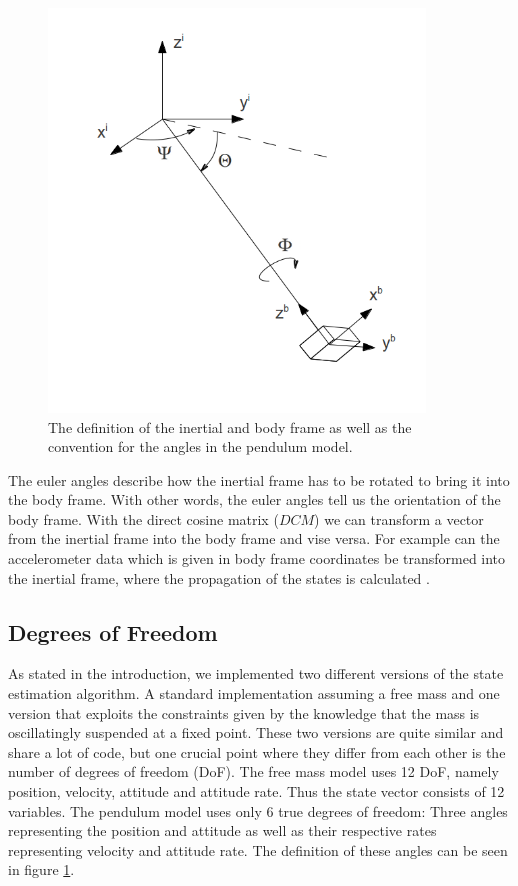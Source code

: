  \begin{figure}[h]
\begin{center}
\includegraphics[width=10cm]{pictures/sketch_coordinate_systems.png}
\caption{The definition of the inertial and body frame as well as the convention for the angles in the pendulum model.}
\label{dof}
\end{center}
\end{figure}

The euler angles describe how the inertial frame has to be rotated to bring it into the body frame. With other words, the euler angles tell us the orientation of the body frame. With the direct cosine matrix ($DCM$) we can transform a vector from the inertial frame into the body frame and vise versa. For example can the accelerometer data which is given in body frame coordinates be transformed into the inertial frame, where the propagation of the states is calculated \cite{andrews2007}.

\subsection*{Degrees of Freedom}
As stated in the introduction, we implemented two different versions of the state estimation algorithm. A standard implementation assuming a free mass and one version that exploits the constraints given by the knowledge that the mass is oscillatingly suspended at a fixed point. These two versions are quite similar and share a lot of code, but one crucial point where they differ from each other is the number of degrees of freedom (DoF). The free mass model uses 12 DoF, namely position, velocity, attitude and attitude rate. Thus the state vector consists of 12 variables. The pendulum model uses only 6 true degrees of freedom: Three angles representing the position and attitude as well as their respective rates representing velocity and attitude rate. The definition of these angles can be seen in figure \ref{dof}.



